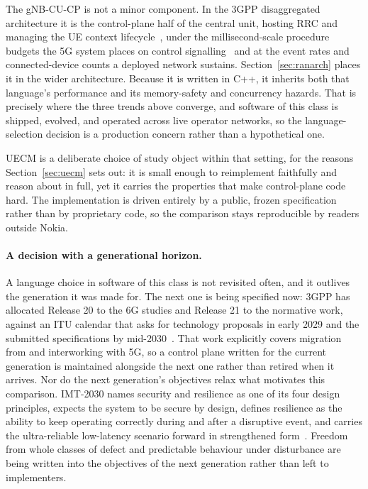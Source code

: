\documentclass[english,oneside,a4paper,censored,csm,software-track-2020]{HYthesisML}
\begin{document}
The gNB-CU-CP is not a minor component. In the 3GPP disaggregated architecture it is the
control-plane half of the central unit, hosting RRC and managing the UE context
lifecycle~\cite{3gpp38401,3gpp38331}, under the millisecond-scale procedure budgets the 5G system
places on control signalling~\cite{3gpp38913} and at the event rates and connected-device counts
a deployed network sustains. Section~\ref{sec:ranarch} places it in the wider architecture.
Because it is written in C++, it inherits both that language's performance and its memory-safety
and concurrency hazards. That is precisely where the three trends above converge, and software of
this class is shipped, evolved, and operated across live operator networks, so the
language-selection decision is a production concern rather than a hypothetical one.

UECM is a deliberate choice of study object within that setting, for the reasons
Section~\ref{sec:uecm} sets out: it is small enough to reimplement faithfully and reason about in
full, yet it carries the properties that make control-plane code hard. The implementation is
driven entirely by a public, frozen specification rather than by proprietary code, so the
comparison stays reproducible by readers outside Nokia.

\paragraph{A decision with a generational horizon.}
A language choice in software of this class is not revisited often, and it outlives the
generation it was made for. The next one is being specified now: 3GPP has allocated Release 20 to
the 6G studies and Release 21 to the normative work, against an ITU calendar that asks for
technology proposals in early 2029 and the submitted specifications by
mid-2030~\cite{3gpp2024road6g}. That work explicitly covers migration from and interworking with
5G, so a control plane written for the current generation is maintained alongside the next one
rather than retired when it arrives. Nor do the next generation's objectives relax what motivates
this comparison. IMT-2030 names security and resilience as one of its four design principles,
expects the system to be secure by design, defines resilience as the ability to keep operating
correctly during and after a disruptive event, and carries the ultra-reliable low-latency scenario
forward in strengthened form~\cite{itu2023imt2030}. Freedom from whole classes of defect and
predictable behaviour under disturbance are being written into the objectives of the next
generation rather than left to implementers.
\end{document}
